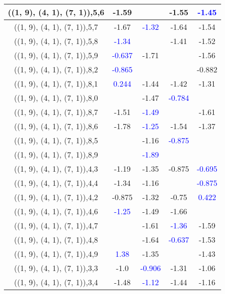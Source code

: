 \documentclass{article}
\begin{document}
\begin{center}
\begin{longtable}{|c|c|c|c|c|}
        	\hline
        	((1, 9), (4, 1), (7, 1)),5,6&-1.59&&-1.55& \textcolor{blue}{-1.45}\\
        	\hline
        	((1, 9), (4, 1), (7, 1)),5,7&-1.67& \textcolor{blue}{-1.32}&-1.64&-1.54\\
        	\hline
        	((1, 9), (4, 1), (7, 1)),5,8& \textcolor{blue}{-1.34}&&-1.41&-1.52\\
        	\hline
        	((1, 9), (4, 1), (7, 1)),5,9& \textcolor{blue}{-0.637}&-1.71&&-1.56\\
        	\hline
        	((1, 9), (4, 1), (7, 1)),8,2& \textcolor{blue}{-0.865}&&&-0.882\\
        	\hline
        	((1, 9), (4, 1), (7, 1)),8,1& \textcolor{blue}{0.244}&-1.44&-1.42&-1.31\\
        	\hline
        	((1, 9), (4, 1), (7, 1)),8,0&&-1.47& \textcolor{blue}{-0.784}&\\
        	\hline
        	((1, 9), (4, 1), (7, 1)),8,7&-1.51& \textcolor{blue}{-1.49}&&-1.61\\
        	\hline
        	((1, 9), (4, 1), (7, 1)),8,6&-1.78& \textcolor{blue}{-1.25}&-1.54&-1.37\\
        	\hline
        	((1, 9), (4, 1), (7, 1)),8,5&&-1.16& \textcolor{blue}{-0.875}&\\
        	\hline
        	((1, 9), (4, 1), (7, 1)),8,9&& \textcolor{blue}{-1.89}&&\\
        	\hline
        	((1, 9), (4, 1), (7, 1)),4,3&-1.19&-1.35&-0.875& \textcolor{blue}{-0.695}\\
        	\hline
        	((1, 9), (4, 1), (7, 1)),4,4&-1.34&-1.16&& \textcolor{blue}{-0.875}\\
        	\hline
        	((1, 9), (4, 1), (7, 1)),4,2&-0.875&-1.32&-0.75& \textcolor{blue}{0.422}\\
        	\hline
        	((1, 9), (4, 1), (7, 1)),4,6& \textcolor{blue}{-1.25}&-1.49&-1.66&\\
        	\hline
        	((1, 9), (4, 1), (7, 1)),4,7&&-1.61& \textcolor{blue}{-1.36}&-1.59\\
        	\hline
        	((1, 9), (4, 1), (7, 1)),4,8&&-1.64& \textcolor{blue}{-0.637}&-1.53\\
        	\hline
        	((1, 9), (4, 1), (7, 1)),4,9& \textcolor{blue}{1.38}&-1.35&&-1.43\\
        	\hline
        	((1, 9), (4, 1), (7, 1)),3,3&-1.0& \textcolor{blue}{-0.906}&-1.31&-1.06\\
        	\hline
        	((1, 9), (4, 1), (7, 1)),3,4&-1.48& \textcolor{blue}{-1.12}&-1.44&-1.16\\

\end{longtable}
\end{center}
\end{document}
